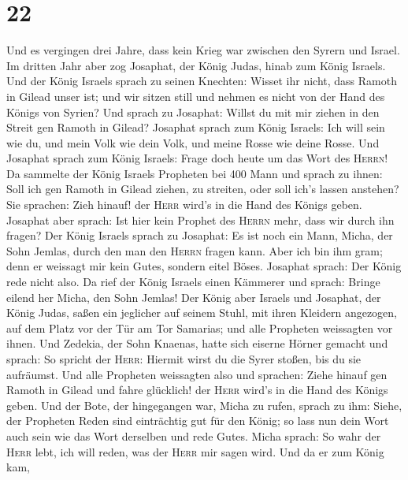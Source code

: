 \hypertarget{section-21}{%
\section{22}\label{section-21}}

 Und es vergingen drei Jahre, dass kein Krieg war zwischen
den Syrern und Israel.  Im dritten Jahr aber zog Josaphat,
der König Judas, hinab zum König Israels.  Und der König
Israels sprach zu seinen Knechten: Wisset ihr nicht, dass Ramoth in
Gilead unser ist; und wir sitzen still und nehmen es nicht von der Hand
des Königs von Syrien?  Und sprach zu Josaphat: Willst du
mit mir ziehen in den Streit gen Ramoth in Gilead? Josaphat sprach zum
König Israels: Ich will sein wie du, und mein Volk wie dein Volk, und
meine Rosse wie deine Rosse.  Und Josaphat sprach zum
König Israels: Frage doch heute um das Wort des \textsc{Herrn}!
 Da sammelte der König Israels Propheten bei 400 Mann und
sprach zu ihnen: Soll ich gen Ramoth in Gilead ziehen, zu streiten, oder
soll ich's lassen anstehen? Sie sprachen: Zieh hinauf! der \textsc{Herr}
wird's in die Hand des Königs geben.  Josaphat aber
sprach: Ist hier kein Prophet des \textsc{Herrn} mehr, dass wir durch
ihn fragen?  Der König Israels sprach zu Josaphat: Es ist
noch ein Mann, Micha, der Sohn Jemlas, durch den man den \textsc{Herrn}
fragen kann. Aber ich bin ihm gram; denn er weissagt mir kein Gutes,
sondern eitel Böses. Josaphat sprach: Der König rede nicht also.
 Da rief der König Israels einen Kämmerer und sprach:
Bringe eilend her Micha, den Sohn Jemlas!  Der König aber
Israels und Josaphat, der König Judas, saßen ein jeglicher auf seinem
Stuhl, mit ihren Kleidern angezogen, auf dem Platz vor der Tür am Tor
Samarias; und alle Propheten weissagten vor ihnen.  Und
Zedekia, der Sohn Knaenas, hatte sich eiserne Hörner gemacht und sprach:
So spricht der \textsc{Herr}: Hiermit wirst du die Syrer stoßen, bis du
sie aufräumst.  Und alle Propheten weissagten also und
sprachen: Ziehe hinauf gen Ramoth in Gilead und fahre glücklich! der
\textsc{Herr} wird's in die Hand des Königs geben.  Und
der Bote, der hingegangen war, Micha zu rufen, sprach zu ihm: Siehe, der
Propheten Reden sind einträchtig gut für den König; so lass nun dein
Wort auch sein wie das Wort derselben und rede Gutes. 
Micha sprach: So wahr der \textsc{Herr} lebt, ich will reden, was der
\textsc{Herr} mir sagen wird.  Und da er zum König kam,
